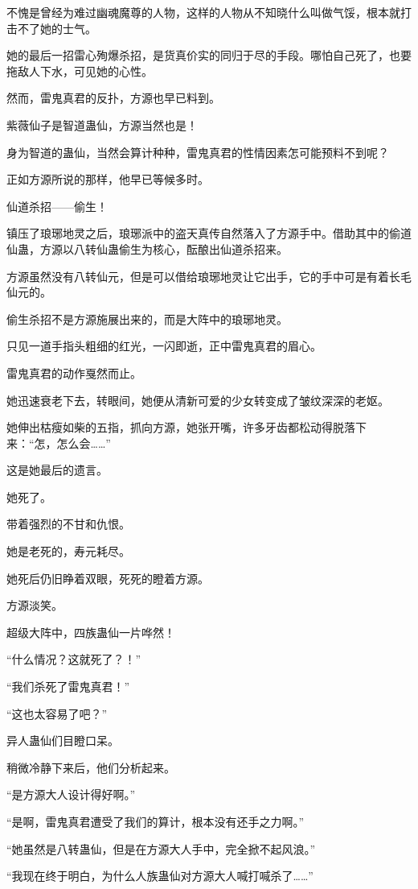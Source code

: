 \begin{this_body}
不愧是曾经为难过幽魂魔尊的人物，这样的人物从不知晓什么叫做气馁，根本就打击不了她的士气。

她的最后一招雷心殉爆杀招，是货真价实的同归于尽的手段。哪怕自己死了，也要拖敌人下水，可见她的心性。

然而，雷鬼真君的反扑，方源也早已料到。

紫薇仙子是智道蛊仙，方源当然也是！

身为智道的蛊仙，当然会算计种种，雷鬼真君的性情因素怎可能预料不到呢？

正如方源所说的那样，他早已等候多时。

仙道杀招——偷生！

镇压了琅琊地灵之后，琅琊派中的盗天真传自然落入了方源手中。借助其中的偷道仙蛊，方源以八转仙蛊偷生为核心，酝酿出仙道杀招来。

方源虽然没有八转仙元，但是可以借给琅琊地灵让它出手，它的手中可是有着长毛仙元的。

偷生杀招不是方源施展出来的，而是大阵中的琅琊地灵。

只见一道手指头粗细的红光，一闪即逝，正中雷鬼真君的眉心。

雷鬼真君的动作戛然而止。

她迅速衰老下去，转眼间，她便从清新可爱的少女转变成了皱纹深深的老妪。

她伸出枯瘦如柴的五指，抓向方源，她张开嘴，许多牙齿都松动得脱落下来：“怎，怎么会……”

这是她最后的遗言。

她死了。

带着强烈的不甘和仇恨。

她是老死的，寿元耗尽。

她死后仍旧睁着双眼，死死的瞪着方源。

方源淡笑。

超级大阵中，四族蛊仙一片哗然！

“什么情况？这就死了？！”

“我们杀死了雷鬼真君！”

“这也太容易了吧？”

异人蛊仙们目瞪口呆。

稍微冷静下来后，他们分析起来。

“是方源大人设计得好啊。”

“是啊，雷鬼真君遭受了我们的算计，根本没有还手之力啊。”

“她虽然是八转蛊仙，但是在方源大人手中，完全掀不起风浪。”

“我现在终于明白，为什么人族蛊仙对方源大人喊打喊杀了……”


\end{this_body}
